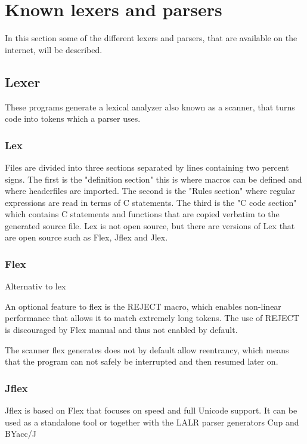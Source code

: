 \section{Known lexers and parsers}
\label{sec:KnownLexersAndParsers}

In this section some of the different lexers and parsers, that are available on the internet, will be described.

\subsection{Lexer}
These programs generate a lexical analyzer also known as a scanner, that turns code into tokens which a parser uses.

\subsubsection{Lex}
Files are divided into three sections separated by lines containing two percent signs. The first is the "definition section" this is where macros can be defined and where headerfiles are imported. The second is the "Rules section" where regular expressions are read in terms of C statements. The third is the "C code section" which contains C statements and functions that are copied verbatim to the generated source file. Lex is not open source, but there are versions of Lex that are open source such as Flex, Jflex and Jlex. \citep{Lex}

\subsubsection{Flex}
Alternativ to lex \citep{Flex}

An optional feature to flex is the REJECT macro, which enables non-linear performance that allows it to match extremely long tokens. The use of REJECT is discouraged by Flex manual and thus not enabled by default. 

The scanner flex generates does not by default allow reentrancy, which means that the program can not safely be interrupted and then resumed later on.

\subsubsection{Jflex}
Jflex is based on Flex that focuses on speed and full Unicode support. It can be used as a standalone tool or together with the LALR parser generators Cup and BYacc/J \citep{Jflex}

